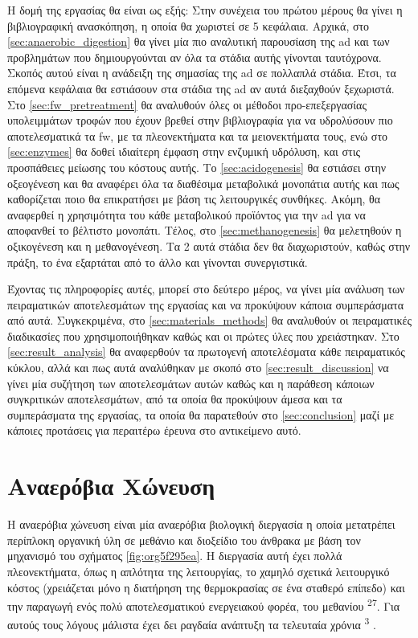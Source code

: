 \documentclass[11pt]{report}
\makeatletter
\newcommand{\citeprocitem}[2]{\hyper@linkstart{cite}{citeproc_bib_item_#1}#2\hyper@linkend}
\makeatother
\begin{document}
Η δομή της εργασίας θα είναι ως εξής: Στην συνέχεια του πρώτου μέρους θα γίνει η βιβλιογραφική ανασκόπηση, η οποία θα χωριστεί σε 5 κεφάλαια. Αρχικά, στο \autoref{sec:anaerobic_digestion} θα γίνει μία πιο αναλυτική παρουσίαση της \acrshort{ad} και των προβλημάτων που δημιουργούνται αν όλα τα στάδια αυτής γίνονται ταυτόχρονα. Σκοπός αυτού είναι η ανάδειξη της σημασίας της \acrshort{ad} σε πολλαπλά στάδια. Έτσι, τα επόμενα κεφάλαια θα εστιάσουν στα στάδια της \acrshort{ad} αν αυτά διεξαχθούν ξεχωριστά. Στο \autoref{sec:fw_pretreatment} θα αναλυθούν όλες οι μέθοδοι προ-επεξεργασίας υπολειμμάτων τροφών που έχουν βρεθεί στην βιβλιογραφία για να υδρολύσουν πιο αποτελεσματικά τα \acrshort{fw}, με τα πλεονεκτήματα και τα μειονεκτήματα τους, ενώ στο \autoref{sec:enzymes} θα δοθεί ιδιαίτερη έμφαση στην ενζυμική υδρόλυση, και στις προσπάθειες μείωσης του κόστους αυτής. Το \autoref{sec:acidogenesis} θα εστιάσει στην οξεογένεση και θα αναφέρει όλα τα διαθέσιμα μεταβολικά μονοπάτια αυτής και πως καθορίζεται ποιο θα επικρατήσει με βάση τις λειτουργικές συνθήκες. Ακόμη, θα αναφερθεί η χρησιμότητα του κάθε μεταβολικού προϊόντος για την \acrshort{ad} για να αποφανθεί το βέλτιστο μονοπάτι. Τέλος, στο \autoref{sec:methanogenesis} θα μελετηθούν η οξικογένεση και η μεθανογένεση. Τα 2 αυτά στάδια δεν θα διαχωριστούν, καθώς στην πράξη, το ένα εξαρτάται από το άλλο και γίνονται συνεργιστικά.

Έχοντας τις πληροφορίες αυτές, μπορεί στο δεύτερο μέρος, να γίνει μία ανάλυση των πειραματικών αποτελεσμάτων της εργασίας και να προκύψουν κάποια συμπεράσματα από αυτά. Συγκεκριμένα, στο \autoref{sec:materials_methods} θα αναλυθούν οι πειραματικές διαδικασίες που χρησιμοποιήθηκαν καθώς και οι πρώτες ύλες που χρειάστηκαν. Στο \autoref{sec:result_analysis} θα αναφερθούν τα πρωτογενή αποτελέσματα κάθε πειραματικός κύκλου, αλλά και πως αυτά αναλύθηκαν με σκοπό στο \autoref{sec:result_discussion} να γίνει μία συζήτηση των αποτελεσμάτων αυτών καθώς και η παράθεση κάποιων συγκριτικών αποτελεσμάτων, από τα οποία θα προκύψουν άμεσα και τα συμπεράσματα της εργασίας, τα οποία θα παρατεθούν στο \autoref{sec:conclusion} μαζί με κάποιες προτάσεις για περαιτέρω έρευνα στο αντικείμενο αυτό.

\chapter{Αναερόβια Χώνευση}
\label{sec:org721740a}
\label{sec:anaerobic_digestion}

Η αναερόβια χώνευση είναι μία αναερόβια βιολογική διεργασία η οποία μετατρέπει περίπλοκη οργανική ύλη σε μεθάνιο και διοξείδιο του άνθρακα με βάση τον μηχανισμό του σχήματος \ref{fig:org5f295ea}. Η διεργασία αυτή έχει πολλά πλεονεκτήματα, όπως η απλότητα της λειτουργίας, το χαμηλό σχετικά λειτουργικό κόστος (χρειάζεται μόνο η διατήρηση της θερμοκρασίας σε ένα σταθερό επίπεδο) και την παραγωγή ενός πολύ αποτελεσματικού ενεργειακού φορέα, του μεθανίου \textsuperscript{\citeprocitem{27}{27}}. Για αυτούς τους λόγους μάλιστα έχει δει ραγδαία ανάπτυξη τα τελευταία χρόνια \textsuperscript{\citeprocitem{3}{3}} .
\end{document}
